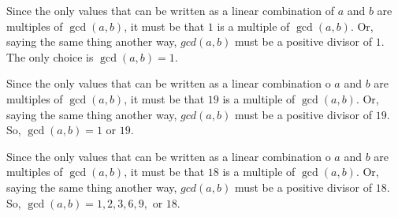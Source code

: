 \begin{Solution}{23.2}
Since the only values that can be written as a linear combination of $a$ and $b$ are multiples of $\gcd(a,b)$, it must be that $1$ is a multiple of $\gcd(a,b)$. Or, saying the same thing  another way, $gcd(a,b)$ must be a positive divisor of $1$. The only choice is $\gcd(a,b) = 1$.

\end{Solution}

\begin{Solution}{23.3}
Since the only values that can be written as a linear combination o $a$ and $b$ are multiples of $\gcd(a,b)$, it must be that $19$ is a multiple of $\gcd(a,b)$. Or, saying the same thing  another way, $gcd(a,b)$ must be a positive divisor of $19$. So, $\gcd(a,b) = 1$ or $19$.


\end{Solution}

\begin{Solution}{23.4}
Since the only values that can be written as a linear combination o $a$ and $b$ are multiples of $\gcd(a,b)$, it must be that $18$ is a multiple of $\gcd(a,b)$. Or, saying the same thing  another way, $gcd(a,b)$ must be a positive divisor of $18$. So, $\gcd(a,b) = 1, 2, 3, 6, 9,$ or $18$.
\end{Solution}


